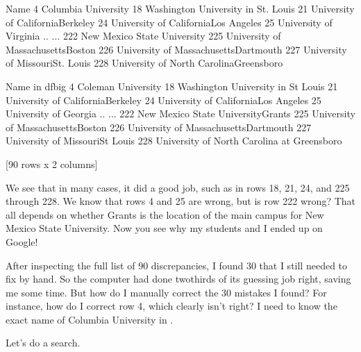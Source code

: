 \documentclass[letterpaper,10pt,english]{sphinxmanual}
\begin{document}
\begin{sphinxVerbatim}[commandchars=\\\{\}]
                                         Name  \PYGZbs{}
4                         Columbia University   
18         Washington University in St. Louis   
21         University of California\PYGZhy{}\PYGZhy{}Berkeley   
24      University of California\PYGZhy{}\PYGZhy{}Los Angeles   
25                     University of Virginia   
..                                        ...   
222               New Mexico State University   
225       University of Massachusetts\PYGZhy{}\PYGZhy{}Boston   
226    University of Massachusetts\PYGZhy{}\PYGZhy{}Dartmouth   
227         University of Missouri\PYGZhy{}\PYGZhy{}St. Louis   
228  University of North Carolina\PYGZhy{}\PYGZhy{}Greensboro   

                                 Name in df\PYGZus{}big  
4                            Coleman University  
18            Washington University in St Louis  
21            University of California\PYGZhy{}Berkeley  
24         University of California\PYGZhy{}Los Angeles  
25                        University of Georgia  
..                                          ...  
222          New Mexico State University\PYGZhy{}Grants  
225          University of Massachusetts\PYGZhy{}Boston  
226       University of Massachusetts\PYGZhy{}Dartmouth  
227             University of Missouri\PYGZhy{}St Louis  
228  University of North Carolina at Greensboro  

[90 rows x 2 columns]
\end{sphinxVerbatim}

We see that in many cases, it did a good job, such as in rows 18, 21, 24, and 225 through 228.  We know that rows 4 and 25 are wrong, but is row 222 wrong?  That all depends on whether Grants is the location of the main campus for New Mexico State University.  Now you see why my students and I ended up on Google!

After inspecting the full list of 90 discrepancies, I found 30 that I still needed to fix by hand.  So the computer had done two\sphinxhyphen{}thirds of its guessing job right, saving me some time.  But how do I manually correct the 30 mistakes I found?  For instance, how do I correct row 4, which clearly isn’t right?  I need to know the exact name of Columbia University in .

Let’s do a search.

\begin{sphinxVerbatim}[commandchars=\\\{\}]
\PYG{p}{[}\PYG{p}{[}\PYG{p}{]}  \PYG{p}{]}\PYG{p}{[}\PYG{p}{]}
\end{sphinxVerbatim}
\end{document}
